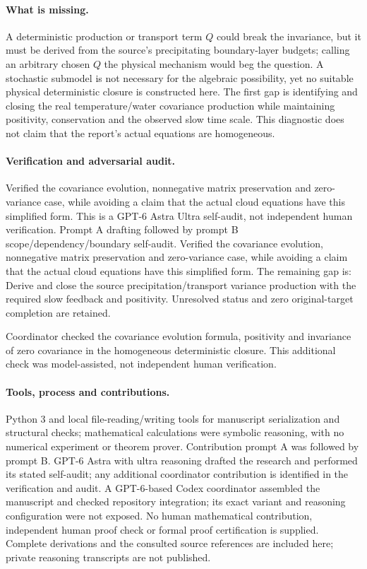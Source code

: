 \documentclass[11pt]{article}
\begin{document}
\paragraph{What is missing.} A deterministic production or transport term \(Q\) could break the invariance, but it must be derived from the source's precipitating boundary-layer budgets; calling an arbitrary chosen \(Q\) the physical mechanism would beg the question. A stochastic submodel is not necessary for the algebraic possibility, yet no suitable physical deterministic closure is constructed here. The first gap is identifying and closing the real temperature/water covariance production while maintaining positivity, conservation and the observed slow time scale. This diagnostic does not claim that the report's actual equations are homogeneous.

\paragraph{Verification and adversarial audit.}
Verified the covariance evolution, nonnegative matrix preservation and zero-variance case, while avoiding a claim that the actual cloud equations have this simplified form. This is a GPT-6 Astra Ultra self-audit, not independent human verification. Prompt A drafting followed by prompt B scope/dependency/boundary self-audit. Verified the covariance evolution, nonnegative matrix preservation and zero-variance case, while avoiding a claim that the actual cloud equations have this simplified form. The remaining gap is: Derive and close the source precipitation/transport variance production with the required slow feedback and positivity. Unresolved status and zero original-target completion are retained.

Coordinator checked the covariance evolution formula, positivity and invariance of zero covariance in the homogeneous deterministic closure. This additional check was model-assisted, not independent human verification.

\paragraph{Tools, process and contributions.}
Python 3 and local file-reading/writing tools for manuscript serialization and structural checks; mathematical calculations were symbolic reasoning, with no numerical experiment or theorem prover. Contribution prompt A was followed by prompt B. GPT-6 Astra with ultra reasoning drafted the research and performed its stated self-audit; any additional coordinator contribution is identified in the verification and audit. A GPT-6-based Codex coordinator assembled the manuscript and checked repository integration; its exact variant and reasoning configuration were not exposed. No human mathematical contribution, independent human proof check or formal proof certification is supplied. Complete derivations and the consulted source references are included here; private reasoning transcripts are not published.
\end{document}
